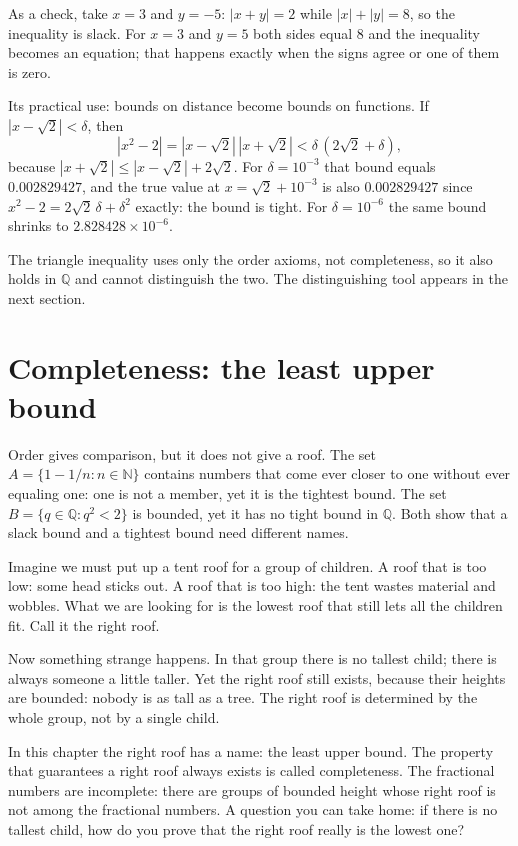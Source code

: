 As a check, take $x=3$ and $y=-5$: $|x+y|=2$ while $|x|+|y|=8$, so the inequality is
slack. For $x=3$ and $y=5$ both sides equal $8$ and the inequality becomes an equation;
that happens exactly when the signs agree or one of them is zero.

Its practical use: bounds on distance become bounds on functions. If
$|x-\sqrt2|<\delta$, then
\[
|x^2-2|=|x-\sqrt2|\,|x+\sqrt2|<\delta\,(2\sqrt2+\delta),
\]
because $|x+\sqrt2|\le|x-\sqrt2|+2\sqrt2$. For $\delta=10^{-3}$ that bound equals
$0.002829427$, and the true value at $x=\sqrt2+10^{-3}$ is also $0.002829427$ since
$x^2-2=2\sqrt2\,\delta+\delta^2$ exactly: the bound is tight. For $\delta=10^{-6}$ the
same bound shrinks to $2.828428\times10^{-6}$.


The triangle inequality uses only the order axioms, not completeness, so it also holds
in $\mathbb{Q}$ and cannot distinguish the two. The distinguishing tool appears in the
next section.

\section{Completeness: the least upper bound}

Order gives comparison, but it does not give a roof. The set
$A=\{1-1/n: n\in\mathbb{N}\}$ contains numbers that come ever closer to one without
ever equaling one: one is not a member, yet it is the tightest bound. The set
$B=\{q\in\mathbb{Q}: q^2<2\}$ is bounded, yet it has no tight bound in
$\mathbb{Q}$. Both show that a slack bound and a tightest bound need different names.

\begin{untukanak}
Imagine we must put up a tent roof for a group of children. A roof that is too low:
some head sticks out. A roof that is too high: the tent wastes material and wobbles.
What we are looking for is the lowest roof that still lets all the children fit. Call
it the right roof.

Now something strange happens. In that group there is no tallest child; there is always
someone a little taller. Yet the right roof still exists, because their heights are
bounded: nobody is as tall as a tree. The right roof is determined by the whole group,
not by a single child.

In this chapter the right roof has a name: the least upper bound. The property that
guarantees a right roof always exists is called completeness. The fractional numbers
are incomplete: there are groups of bounded height whose right roof is not among the
fractional numbers. A question you can take home: if there is no tallest child, how do
you prove that the right roof really is the lowest one?
\end{untukanak}

